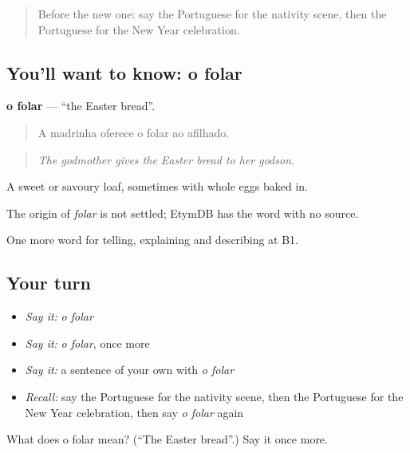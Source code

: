 \begin{quote}
Before the new one: say the Portuguese for the nativity scene, then the Portuguese for the New Year celebration.
\end{quote}

\subsection*{You'll want to know: o folar}
\textbf{o folar} — \textquotedblleft{}the Easter bread\textquotedblright{}.

\begin{quote}
A madrinha oferece o folar ao afilhado.
\end{quote}

\begin{quote}
\emph{The godmother gives the Easter bread to her godson.}
\end{quote}

A sweet or savoury loaf, sometimes with whole eggs baked in.

\begin{cousinweb}
The origin of \emph{folar} is not settled; EtymDB has the word with no source.
\end{cousinweb}

\begin{grammarlens}[title={What you've built}]
One more word for telling, explaining and describing at B1.
\end{grammarlens}

\subsection*{Your turn}
\begin{itemize}
\raggedright
  \item \emph{Say it:} \emph{o folar}
  \item \emph{Say it:} \emph{o folar}, once more
  \item \emph{Say it:} a sentence of your own with \emph{o folar}
  \item \emph{Recall:} say the Portuguese for the nativity scene, then the Portuguese for the New Year celebration, then say \emph{o folar} again
\end{itemize}

\begin{tcolorbox}[breakable,colback=teal!4,colframe=teal!35!black,title={Before you move on}]
What does o folar mean? (\textquotedblleft{}The Easter bread\textquotedblright{}.) Say it once more.
\end{tcolorbox}
